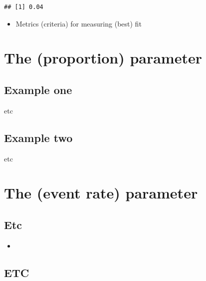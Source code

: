 \documentclass[]{book}
\newenvironment{Shaded}{\begin{snugshade}}{\end{snugshade}}
\newcommand{\DecValTok}[1]{\textcolor[rgb]{0.00,0.00,0.81}{#1}}
\newcommand{\KeywordTok}[1]{\textcolor[rgb]{0.13,0.29,0.53}{\textbf{#1}}}
\newcommand{\NormalTok}[1]{#1}
\newcommand{\OperatorTok}[1]{\textcolor[rgb]{0.81,0.36,0.00}{\textbf{#1}}}
\providecommand{\tightlist}{%
  \setlength{\itemsep}{0pt}\setlength{\parskip}{0pt}}
\begin{document}
\begin{Shaded}
\end{Shaded}

\begin{verbatim}
## [1] 0.04
\end{verbatim}

\begin{itemize}
\tightlist
\item
  Metrics (criteria) for measuring (best) fit
\end{itemize}

\hypertarget{paraPi}{%
\chapter{The (proportion) parameter}\label{paraPi}}

\hypertarget{example-one}{%
\section{Example one}\label{example-one}}

etc

\hypertarget{example-two}{%
\section{Example two}\label{example-two}}

etc

\hypertarget{paraLambda}{%
\chapter{The (event rate) parameter}\label{paraLambda}}

\hypertarget{etc}{%
\section{Etc}\label{etc}}

\begin{itemize}
\item
\end{itemize}

\hypertarget{etc-1}{%
\section{ETC}\label{etc-1}}
\end{document}
